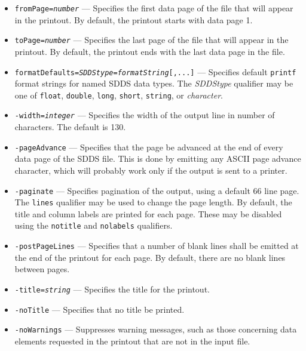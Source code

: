 \begin{itemize}
\begin{itemize}
    \item {\tt fromPage={\em number}} --- Specifies the first data page of the file that will 
        appear in the printout.  By default, the printout starts with data page 1.

    \item {\tt toPage={\em number}} --- Specifies the last page of the file that will appear in 
        the printout.  By default, the printout ends with the last data page in the file.

    \item {\tt formatDefaults={\em SDDStype}={\em formatString}[,...]} --- Specifies default 
        {\tt printf} format strings for named SDDS data types.  The {\em SDDStype} qualifier may be
        one of {\tt float}, {\tt double}, {\tt long}, {\tt short}, {\tt string}, or {\em character}.

    \item {\tt -width={\em integer}} --- Specifies the width of the output line in number of characters. 
        The default is 130.

    \item {\tt -pageAdvance} --- Specifies that the page be advanced at the end of every data
        page of the SDDS file.  This is done by emitting any ASCII page advance character, which
        will probably work only if the output is sent to a printer.

    \item {\tt -paginate} --- Specifies pagination of the output, using a default 66 line page.
        The {\tt lines} qualifier may be used to change the page length.  By default, the title
        and column labels are printed for each page.  These may be disabled using the 
        {\tt notitle} and {\tt nolabels} qualifiers.

    \item {\tt -postPageLines} --- Specifies that a number of blank lines shall be emitted
        at the end of the printout for each page.  By default, there are no blank lines between
        pages.

    \item {\tt -title={\em string}} --- Specifies the title for the printout.
    \item {\tt -noTitle} --- Specifies that no title be printed.
    \item {\tt -noWarnings} --- Suppresses warning messages, such as those concerning data elements
        requested in the printout that are not in the input file.


\end{itemize}
\end{itemize}
